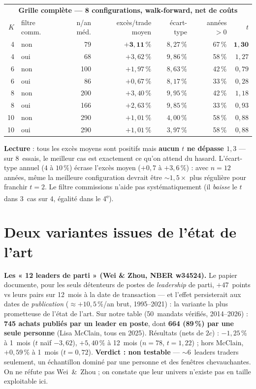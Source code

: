 \documentclass[11pt,a4paper]{article}
\begin{document}
\begin{center}\small
\begin{tabular}{rlrrrrr}
\toprule
\multicolumn{7}{c}{\textbf{Grille complète --- 8 configurations, walk-forward, net de coûts}}\\
$K$ & filtre comm. & n/an méd. & excès/trade moyen & écart-type & années $>0$ & $t$ \\
\midrule
4 & non & 79 & $\mathbf{+3{,}11\,\%}$ & $8{,}27\,\%$ & 67\,\% & $\mathbf{1{,}30}$ \\
4 & oui & 68 & $+3{,}62\,\%$ & $9{,}86\,\%$ & 58\,\% & $1{,}27$ \\
6 & non & 100 & $+1{,}97\,\%$ & $8{,}63\,\%$ & 42\,\% & $0{,}79$ \\
6 & oui & 86 & $+0{,}67\,\%$ & $8{,}17\,\%$ & 33\,\% & $0{,}28$ \\
8 & non & 200 & $+3{,}40\,\%$ & $9{,}95\,\%$ & 42\,\% & $1{,}18$ \\
8 & oui & 166 & $+2{,}63\,\%$ & $9{,}85\,\%$ & 33\,\% & $0{,}93$ \\
10 & non & 290 & $+1{,}01\,\%$ & $4{,}00\,\%$ & 58\,\% & $0{,}88$ \\
10 & oui & 290 & $+1{,}01\,\%$ & $3{,}97\,\%$ & 58\,\% & $0{,}88$ \\
\bottomrule
\end{tabular}
\end{center}

\textbf{Lecture} : tous les excès moyens sont positifs mais \textbf{aucun $t$ ne dépasse $1{,}3$} --- sur
8~essais, le meilleur cas est exactement ce qu'on attend du hasard. L'écart-type annuel ($4$ à $10\,\%$)
écrase l'excès moyen ($+0{,}7$ à $+3{,}6\,\%$) : avec $n=12$ années, même la meilleure configuration
devrait être $\sim1{,}5\times$ plus régulière pour franchir $t=2$. Le filtre commissions n'aide pas
systématiquement (il \emph{baisse} le $t$ dans 3~cas sur 4, égalité dans le 4\textsuperscript{e}).

\section{Deux variantes issues de l'état de l'art}\label{sec:variantes}

\textbf{Les « 12 leaders de parti » (Wei \& Zhou, NBER w34524).} Le papier documente, pour les seuls
détenteurs de postes de \emph{leadership} de parti, $+47$~points vs leurs pairs sur 12~mois à la date de
transaction --- et l'effet persisterait aux dates de \emph{publication} ($\approx+10{,}5\,\%$/an brut,
1995--2021) : la variante la plus prometteuse de l'état de l'art. Sur notre table (50~mandats vérifiés,
2014--2026) : \textbf{745 achats publiés par un leader en poste}, dont \textbf{664 (89\,\%) par une seule
personne} (Lisa McClain, tous en 2025). Résultats (nets de $2c$) : $-1{,}25\,\%$ à 1~mois ($t$ naïf $-3{,}62$),
$+5{,}40\,\%$ à 12~mois ($n=78$, $t=1{,}22$) ; hors McClain, $+0{,}59\,\%$ à 1~mois ($t=0{,}72$).
\textbf{Verdict : non testable} --- $\sim$6~leaders traders seulement, un échantillon dominé par une
personne et des fenêtres chevauchantes. On ne réfute pas Wei~\&~Zhou ; on constate que leur univers
n'existe pas en taille exploitable ici.
\end{document}

